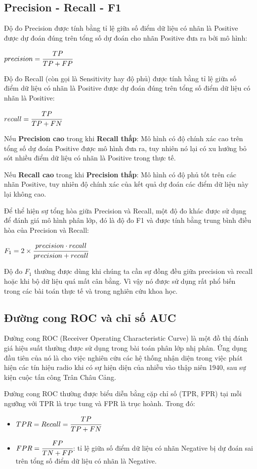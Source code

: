 \documentclass[12pt,a4paper,oneside]{book}
\begin{document}
	\subsection{Precision - Recall - F1}
	Độ đo Precision được tính bằng tỉ lệ giữa số điểm dữ liệu có nhãn là Positive được dự đoán đúng trên tổng số dự đoán cho nhãn Positive đưa ra bởi mô hình:
	
	\centerline{$precision = \cfrac{TP}{TP+FP}$}
	\vspace{1em}
	Độ đo Recall (còn gọi là Sensitivity hay độ phủ) được tính bằng tỉ lệ giữa số điểm dữ liệu có nhãn là Positive được dự đoán đúng trên tổng số điểm dữ liệu có nhãn là Positive:
		
	\centerline{$recall = \cfrac{TP}{TP+FN}$}
	\vspace{1em}
	
	Nếu \textbf{Precision cao} trong khi \textbf{Recall thấp}: Mô hình có độ chính xác cao trên tổng số dự đoán Positive được mô hình đưa ra, tuy nhiên nó lại có xu hướng bỏ sót nhiều điểm dữ liệu có nhãn là Positive trong thực tế.
	
	Nếu \textbf{Recall cao} trong khi \textbf{Precision thấp}: Mô hình có độ phủ tốt trên các nhãn Positive, tuy nhiên độ chính xác của kết quả dự đoán các điểm dữ liệu này lại không cao.
	
	Để thể hiện sự tổng hòa giữa Precision và Recall, một độ đo khác được sử dụng để đánh giá mô hình phân lớp, đó là độ đo F1 và được tính bằng trung bình điều hòa của Precision và Recall:  
	
	\centerline{$F_1 = 2 \times \cfrac{precision\cdot recall}{precision+recall}$}
	\vspace{1em}
	Độ đo $F_1$ thường được dùng khi chúng ta cần sự đồng đều giữa precision và recall hoặc khi bộ dữ liệu quá mất cân bằng. Vì vậy nó được sử dụng rất phổ biến trong các bài toán thực tế và trong nghiên cứu khoa học.
	
	\subsection{Đường cong ROC và chỉ số AUC}
	Đường cong ROC (Receiver Operating Characteristic Curve) là một đồ thị đánh giá hiệu suất thường được sử dụng trong bài toán phân lớp nhị phân. Ứng dụng đầu tiên của nó là cho việc nghiên cứu các hệ thống nhận diện trong việc phát hiện các tín hiệu radio khi có sự hiện diện của nhiễu vào thập niên 1940, sau sự kiện cuộc tấn công Trân Châu Cảng. 
	
	Đường cong ROC thường được biểu diễn bằng cặp chỉ số (TPR, FPR) tại mỗi ngưỡng với TPR là trục tung và FPR là trục hoành. Trong đó:
	\begin{itemize}
	\item $TPR = Recall = \cfrac{TP}{TP+FN}$
	\item $FPR = \cfrac{FP}{TN+FP}\vspace{1em}$: tỉ lệ giữa số điểm dữ liệu có nhãn Negative bị dự đoán sai trên tổng số điểm dữ liệu có nhãn là Negative.
	\end{itemize}
	
\end{document}
